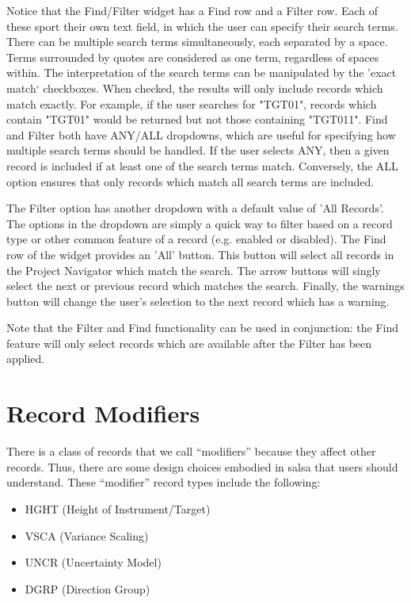 Notice that the Find/Filter widget has a Find row and a Filter row. Each of these sport their own text field, in which the user can specify their search terms. There can be multiple search terms simultaneously, each separated by a space. Terms surrounded by quotes are considered as one term, regardless of spaces within. The interpretation of the search terms can be manipulated by the 'exact match` checkboxes. When checked, the results will only include records which match exactly. For example, if the user searches for "TGT01", records which contain "TGT01" would be returned but not those containing "TGT011". Find and Filter both have ANY/ALL dropdowns, which are useful for specifying how multiple search terms should be handled. If the user selects ANY, then a given record is included if at least one of the search terms match. Conversely, the ALL option ensures that only records which match all search terms are included.

The Filter option has another dropdown with a default value of 'All Records'. The options in the dropdown are simply a quick way to filter based on a record type or other common feature of a record (e.g. enabled or disabled).  The Find row of the widget provides an 'All' button. This button will select all records in the Project Navigator which match the search. The arrow buttons will singly select the next or previous record which matches the search. Finally, the warnings button will change the user's selection to the next record which has a warning.

Note that the Filter and Find functionality can be used in conjunction: the Find feature will only select records which are available after the Filter has been applied.

\section{Record Modifiers}

There is a class of records that we call ``modifiers'' because they affect other records.  Thus, there are some design choices embodied in \textsf{salsa} that users should understand.  These ``modifier'' record types include the following:
\begin{itemize}
\item HGHT (Height of Instrument/Target)
\item VSCA (Variance Scaling)
\item UNCR (Uncertainty Model)
\item DGRP (Direction Group)
\end{itemize}


